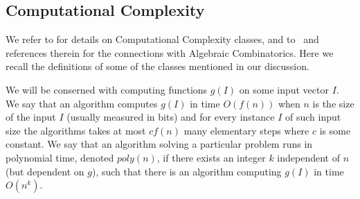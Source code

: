 \documentclass[11pt]{amsart}
\newcommand{\darkblue}{\color{darkblue}}
\newcommand{\defn}[1]{\emph{\darkblue #1}}
\theoremstyle{plain}
\theoremstyle{definition}
\numberwithin{equation}{section}
\newcommand{\la}{\lambda}
\newcommand{\al}{\alpha}
\newcommand{\be}{\beta}
\def\.{\hskip.06cm}
\def\ts{\hskip.03cm}
\newcommand{\poly}{poly}
\def\la{\lambda}
\begin{document}
%

\subsection{Computational Complexity}\label{ss:cc}
We refer to \cite{Aa,Wig} for details on Computational Complexity classes, and to~\cite{Pak22,Pan23} and references therein for the connections with Algebraic Combinatorics. Here we recall the definitions of some of the classes mentioned in our discussion.

We will be conserned with computing functions $g(I)$ on some input vector $I$. We say that an algorithm computes  $g(I)$ in time $O(f(n))$ when $n$ is the size of the input $I$ (usually measured in bits)   and for every instance $I$ of such input size the algorithms takes at most $c f(n)$ many elementary steps where $c$ is some constant. We say that an algorithm solving a particular problem  runs in polynomial time, denoted $\poly(n)$, if there exists an integer $k$ independent of $n$ (but dependent on $g$), such that there is an algorithm computing $g(I)$ in time $O(n^k)$.  
\end{document}
